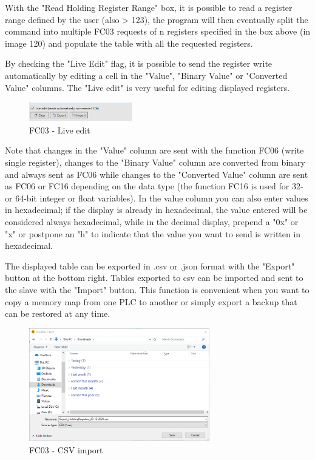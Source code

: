 With the "Read Holding Register Range" box, it is possible to read a register range defined
by the user (also > 123), the program will then eventually split the command into multiple
FC03 requests of n registers specified in the box above (in image 120)
and populate the table with all the requested registers.

By checking the "Live Edit" flag, it is possible to send the register write automatically
by editing a cell in the "Value", "Binary Value" or "Converted Value" columns. The
"Live edit" is very useful for editing displayed registers.

\begin{figure}[H]
\centering
\includegraphics[width=0.40\textwidth]{../Img/ModBus_Client_HoldingReg_Live.PNG}
\caption{FC03 - Live edit}
\end{figure}

Note that changes in the "Value" column are sent with the function FC06
(write single register), changes to the "Binary Value" column are converted from
binary and always sent as FC06 while changes to the "Converted Value" column
are sent as FC06 or FC16 depending on the data type (the function 
FC16 is used
for 32- or 64-bit integer or float variables). In the value column you can also enter 
values in hexadecimal; if the display is already in hexadecimal, the value entered will be considered
always hexadecimal, while in the decimal display, prepend a "0x" or "x" or postpone an "h"
to indicate that the value you want to send is written in hexadecimal.


The displayed table can be exported in .csv or .json format with the "Export" button at the bottom
right. Tables exported to csv can be imported and sent to the slave with the "Import" button.
This function is convenient when you want to copy a memory map from one PLC to another or simply
export a backup that can be restored at any time.

\begin{figure}[H]
\centering
\includegraphics[width=0.70\textwidth]{../Img/ModBus_Client_HoldingReg_Import.PNG}
\caption{FC03 - CSV import}
\end{figure}

